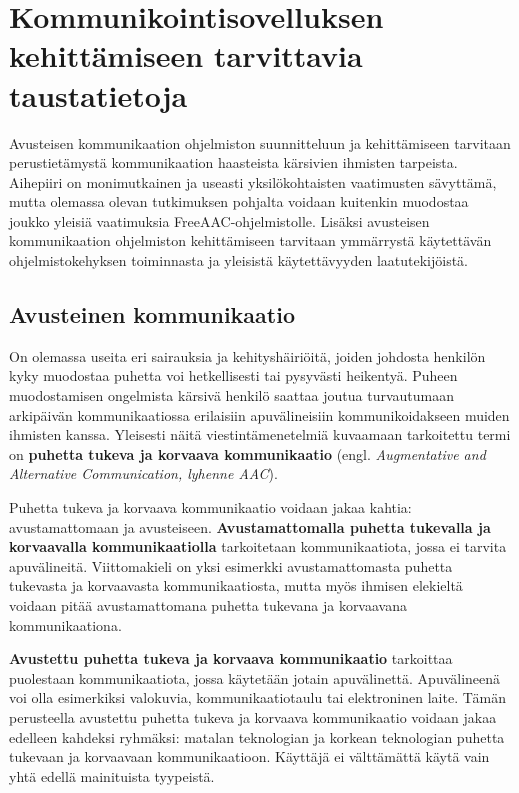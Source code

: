 \documentclass[utf8]{gradu3}
\begin{document}
\chapter{Kommunikointisovelluksen kehittämiseen tarvittavia taustatietoja}

Avusteisen kommunikaation ohjelmiston suunnitteluun ja kehittämiseen tarvitaan perustietämystä kommunikaation haasteista kärsivien ihmisten tarpeista. Aihepiiri on monimutkainen ja useasti yksilökohtaisten vaatimusten sävyttämä, mutta olemassa olevan tutkimuksen pohjalta voidaan kuitenkin muodostaa joukko yleisiä vaatimuksia FreeAAC-ohjelmistolle. Lisäksi avusteisen kommunikaation ohjelmiston kehittämiseen tarvitaan ymmärrystä käytettävän ohjelmistokehyksen toiminnasta ja yleisistä käytettävyyden laatutekijöistä.

\section{Avusteinen kommunikaatio}

On olemassa useita eri sairauksia ja kehityshäiriöitä, joiden johdosta henkilön kyky muodostaa puhetta voi hetkellisesti tai pysyvästi heikentyä. Puheen muodostamisen ongelmista kärsivä henkilö saattaa joutua turvautumaan arkipäivän kommunikaatiossa erilaisiin apuvälineisiin kommunikoidakseen muiden ihmisten kanssa. Yleisesti näitä viestintämenetelmiä kuvaamaan tarkoitettu termi on \textbf{puhetta tukeva ja korvaava kommunikaatio} (engl. \textit{Augmentative and Alternative Communication, lyhenne AAC}).

Puhetta tukeva ja korvaava kommunikaatio voidaan jakaa kahtia: avustamattomaan ja avusteiseen. \textbf{Avustamattomalla puhetta tukevalla ja korvaavalla kommunikaatiolla} tarkoitetaan kommunikaatiota, jossa ei tarvita apuvälineitä. Viittomakieli on yksi esimerkki avustamattomasta puhetta tukevasta ja korvaavasta kommunikaatiosta, mutta myös ihmisen elekieltä voidaan pitää avustamattomana puhetta tukevana ja korvaavana kommunikaationa. 

\textbf{Avustettu puhetta tukeva ja korvaava kommunikaatio} tarkoittaa puolestaan kommunikaatiota, jossa käytetään jotain apuvälinettä. Apuvälineenä voi olla esimerkiksi valokuvia, kommunikaatiotaulu tai elektroninen laite. Tämän perusteella avustettu puhetta tukeva ja korvaava kommunikaatio voidaan jakaa edelleen kahdeksi ryhmäksi: matalan teknologian ja korkean teknologian puhetta tukevaan ja korvaavaan kommunikaatioon. Käyttäjä ei välttämättä käytä vain yhtä edellä mainituista tyypeistä. \parencite[]{AAC-conditional-use}
\end{document}
